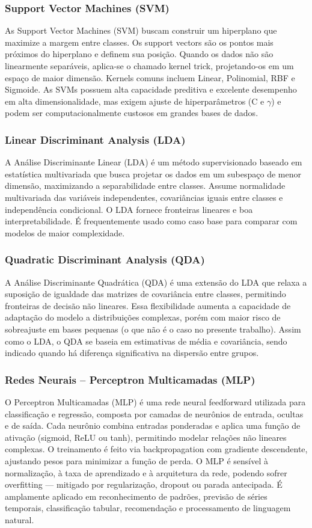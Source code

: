 \documentclass[english, spanish, brazilian]{RBIEarticle} %
\begin{document}
\subsubsection{Support Vector Machines (SVM)}
As Support Vector Machines (SVM) buscam construir um hiperplano que maximize a margem entre classes. Os support vectors são os pontos mais próximos do hiperplano e definem sua posição. Quando os dados não são linearmente separáveis, aplica-se o chamado kernel trick, projetando-os em um espaço de maior dimensão. Kernels comuns incluem Linear, Polinomial, RBF e Sigmoide. As SVMs possuem alta capacidade preditiva e excelente desempenho em alta dimensionalidade, mas exigem ajuste de hiperparâmetros (C e \(\gamma\)) e podem ser computacionalmente custosos em grandes bases de dados.

\subsubsection{Linear Discriminant Analysis (LDA)}
A Análise Discriminante Linear (LDA) é um método supervisionado baseado em estatística multivariada que busca projetar os dados em um subespaço de menor dimensão, maximizando a separabilidade entre classes. Assume normalidade multivariada das variáveis independentes, covariâncias iguais entre classes e independência condicional. O LDA fornece fronteiras lineares e boa interpretabilidade. É frequentemente usado como caso base para comparar com modelos de maior complexidade.

\subsubsection{Quadratic Discriminant Analysis (QDA)}
A Análise Discriminante Quadrática (QDA) é uma extensão do LDA que relaxa a suposição de igualdade das matrizes de covariância entre classes, permitindo fronteiras de decisão não lineares. Essa flexibilidade aumenta a capacidade de adaptação do modelo a distribuições complexas, porém com maior risco de sobreajuste em bases pequenas (o que não é o caso no presente trabalho). Assim como o LDA, o QDA se baseia em estimativas de média e covariância, sendo indicado quando há diferença significativa na dispersão entre grupos.

\subsubsection{Redes Neurais – Perceptron Multicamadas (MLP)}
O Perceptron Multicamadas (MLP) é uma rede neural feedforward utilizada para classificação e regressão, composta por camadas de neurônios de entrada, ocultas e de saída. Cada neurônio combina entradas ponderadas e aplica uma função de ativação (sigmoid, ReLU ou tanh), permitindo modelar relações não lineares complexas. O treinamento é feito via backpropagation com gradiente descendente, ajustando pesos para minimizar a função de perda. O MLP é sensível à normalização, à taxa de aprendizado e à arquitetura da rede, podendo sofrer overfitting — mitigado por regularização, dropout ou parada antecipada. É amplamente aplicado em reconhecimento de padrões, previsão de séries temporais, classificação tabular, recomendação e processamento de linguagem natural.
\end{document}
